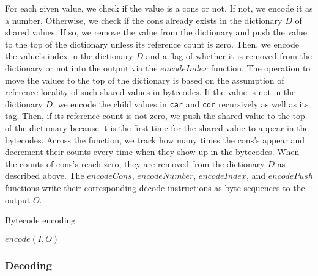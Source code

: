 \documentclass[sigplan, anonymous, review]{acmart}
\begin{document}
For each given value, we check if the value is a cons or not.
If not, we encode it as a number.
Otherwise, we check if the cons already exists in the dictionary $D$ of
shared values.
If so, we remove the value from the dictionary and push the value to
the top of the dictionary unless its reference count is zero.
Then, we encode the value's index in the dictionary $D$ and a flag of whether it
is removed from the dictionary or not into the output via the
$encodeIndex$ function.
The operation to move the values to the top of the dictionary is based on the
assumption of reference locality of such shared values in bytecodes.
If the value is not in the dictionary $D$, we encode the child values in
\texttt{car} and \texttt{cdr} recursively as well as its tag.
Then, if its reference count is not zero, we push the shared value to
the top of the dictionary because it is the first time for the shared value
to appear in the bytecodes.
Across the function, we track how many times the cons's appear and
decrement their counts every time when they show up in the bytecodes.
When the counts of cons's reach zero, they are removed from the
dictionary $D$ as described above.
The $encodeCons$, $encodeNumber$, $encodeIndex$, and $encodePush$
functions write their corresponding decode instructions as byte
sequences to the output $O$.

\begin{algorithm}
  \caption{Bytecode encoding}
  \label{algorithm:encode}



  $encode(I, O)$ \;
\end{algorithm}

\subsubsection{Decoding} \label{decoding}
\end{document}
